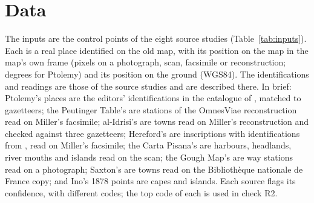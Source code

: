 \documentclass[11pt,a4paper]{article}
\begin{document}
\section{Data}\label{sec:data}
The inputs are the control points of the eight source studies (Table~\ref{tab:inputs}). Each is a real place identified on the old map, with its position on the map in the map's own frame (pixels on a photograph, scan, facsimile or reconstruction; degrees for Ptolemy) and its position on the ground (WGS84). The identifications and readings are those of the source studies and are described there. In brief: Ptolemy's places are the editors' identifications in the catalogue of \citet{grasshoff2019}, matched to gazetteers; the Peutinger Table's are stations of the OmnesViae reconstruction read on Miller's facsimile; al-Idrisi's are towns read on Miller's reconstruction and checked against three gazetteers; Hereford's are inscriptions with identifications from \citet{bevan1873}, read on Miller's facsimile; the Carta Pisana's are harbours, headlands, river mouths and islands read on the scan; the Gough Map's are way stations read on a photograph; Saxton's are towns read on the Biblioth\`eque nationale de France copy; and Ino's 1878 points are capes and islands. Each source flags its confidence, with different codes; the top code of each is used in check R2.
\end{document}
